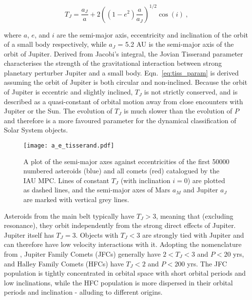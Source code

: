 \vspace{-2ex}
\begin{equation}
    T_J = \dfrac{a_J}{a} + 2\left( {(1-e^2)\dfrac{a}{a_J}} \right)^{1/2} \cos(i)~,
\label{eq:tiss_param}
\end{equation}

where $a$, $e$, and $i$ are the semi-major axis, eccentricity and inclination of the orbit of a small body respectively, while $a_J$ = 5.2 AU is the semi-major axis of the orbit of Jupiter. Derived from Jacobi's integral, the Jovian Tisserand parameter characterises the strength of the gravitational interaction between strong planetary perturber Jupiter and a small body. Eqn.~\eqref{eq:tiss_param} is derived assuming the orbit of Jupiter is both circular and non-inclined. Because the orbit of Jupiter is eccentric and slightly inclined, $T_J$ is not strictly conserved, and is described as a quasi-constant of orbital motion away from close encounters with Jupiter or the Sun. The evolution of $T_J$ is much slower than the evolution of $P$ and therefore is a more favoured parameter for the dynamical classification of Solar System objects. 

\begin{figure}[t!]
    \centering
    \vspace{-3ex}
    \texttt{[image: a\_e\_tisserand.pdf]}
    \caption[Tisserand parameter plot for known asteroids and comets]{A plot of the semi-major axes against eccentricities of the first 50000 numbered asteroids (blue) and all comets (red) catalogued by the IAU MPC. Lines of constant $T_J$ (with inclination $i=0$) are plotted as dashed lines, and the semi-major axes of Mars $a_M$ and Jupiter $a_J$ are marked with vertical grey lines.}
    \label{fig:tiss_param}
\end{figure}

Asteroids from the main belt typically have $T_J > 3$, meaning that (excluding resonance), they orbit independently from the strong direct effects of Jupiter. Jupiter itself has  $T_J = 3$. Objects with  $T_J < 3$ are strongly tied with Jupiter and can therefore have low velocity interactions with it. Adopting the nomenclature from \cite{1987PAICz..67...21C}, Jupiter Family Comets (JFCs) generally have $2 < T_J < 3$ and $P < 20$ yrs, and Halley Family Comets (HFCs) have $T_J < 2$ and $P < 200$ yrs. The JFC population is tightly concentrated in orbital space with short orbital periods and low inclinations, while the HFC population is more dispersed in their orbital periods and inclination - alluding to different origins.

